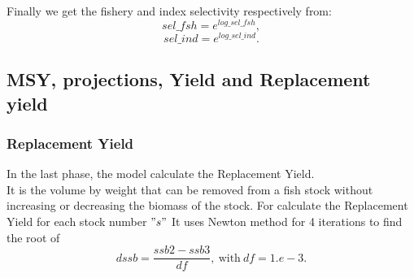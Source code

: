 \documentclass{article}
\begin{document}
Finally we get the fishery and index selectivity respectively from:
\begin{equation}
    sel\_fsh=e^{log\_sel\_fsh},
\end{equation}
\begin{equation}
    sel\_ind=e^{log\_sel\_ind}.
\end{equation}


\subsection{MSY, projections, Yield and Replacement yield} 




\subsubsection{Replacement Yield}
In the last phase, the model calculate the Replacement Yield.\\
It is the volume by weight that can be removed from a fish stock without increasing or decreasing the biomass of the stock.
For calculate the Replacement Yield for each stock  number $"s"$ It uses Newton method for 4 iterations to find the root of 
\begin{equation}
    dssb   = \dfrac{ssb2 - ssb3}{df}, \ \text{with} \  df=1.e-3.
\end{equation}
\end{document}
